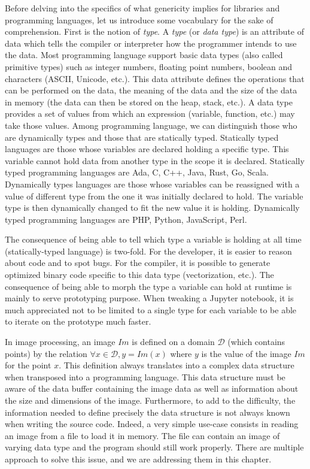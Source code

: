 Before delving into the specifics of what genericity implies for libraries and programming languages, let us introduce
some vocabulary for the sake of comprehension. First is the notion of \emph{type}. A \emph{type} (or \emph{data type})
is an attribute of data which tells the compiler or interpreter how the programmer intends to use the data. Most
programming language support basic data types (also called primitive types) such as integer numbers, floating point
numbers, boolean and characters (ASCII, Unicode, etc.). This data attribute defines the operations that can be performed
on the data, the meaning of the data and the size of the data in memory (the data can then be stored on the heap, stack,
etc.). A data type provides a set of values from which an expression (\ie variable, function, etc.) may take those
values. Among programming language, we can distinguish those who are dynamically types and those that are statically
typed. Statically typed languages are those whose variables are declared holding a specific type. This variable cannot
hold data from another type in the scope it is declared. Statically typed programming languages are Ada, C, C++, Java,
Rust, Go, Scala. Dynamically types languages are those whose variables can be reassigned with a value of different type
from the one it was initially declared to hold. The variable type is then dynamically changed to fit the new value it is
holding. Dynamically typed programming languages are PHP, Python, JavaScript, Perl.

The consequence of being able to tell which type a variable is holding at all time (statically-typed language) is
two-fold. For the developer, it is easier to reason about code and to spot bugs. For the compiler, it is possible to
generate optimized binary code specific to this data type (vectorization, etc.). The consequence of being able to morph
the type a variable can hold at runtime is mainly to serve prototyping purpose. When tweaking a Jupyter notebook, it is
much appreciated not to be limited to a single type for each variable to be able to iterate on the prototype much
faster.

In image processing, an image \(Im\) is defined on a domain \(\mathcal{D}\) (which contains points) by the relation
\(\forall x \in \mathcal{D}, y = Im(x)\) where \(y\) is the value of the image \(Im\) for the point \(x\). This
definition always translates into a complex data structure when transposed into a programming language. This data
structure must be aware of the data buffer containing the image data as well as information about the size and
dimensions of the image. Furthermore, to add to the difficulty, the information needed to define precisely the data
structure is not always known when writing the source code. Indeed, a very simple use-case consists in reading an image
from a file to load it in memory. The file can contain an image of varying data type and the program should still work
properly. There are multiple approach to solve this issue, and we are addressing them in this chapter.

